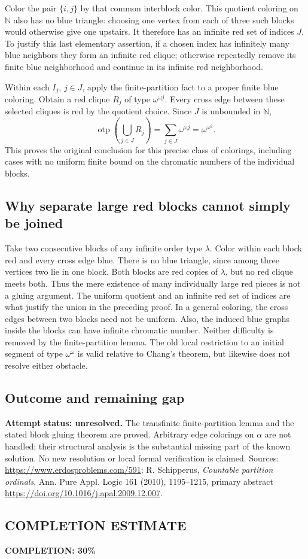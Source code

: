 Color the pair $\{i,j\}$ by that common interblock color. This quotient coloring on $\mathbb N$ also has no blue triangle: choosing one vertex from each of three such blocks would otherwise give one upstairs. It therefore has an infinite red set of indices $J$. To justify this last elementary assertion, if a chosen index has infinitely many blue neighbors they form an infinite red clique; otherwise repeatedly remove its finite blue neighborhood and continue in its infinite red neighborhood.

Within each $I_j$, $j\in J$, apply the finite-partition fact to a proper finite blue coloring. Obtain a red clique $R_j$ of type $\omega^{\omega j}$. Every cross edge between these selected cliques is red by the quotient choice. Since $J$ is unbounded in $\mathbb N$,
\[\operatorname{otp}\left(\bigcup_{j\in J}R_j\right)
=\sum_{j\in J}\omega^{\omega j}=\omega^{\omega^2}.
\]
This proves the original conclusion for this precise class of colorings, including cases with no uniform finite bound on the chromatic numbers of the individual blocks.

\subsection*{Why separate large red blocks cannot simply be joined}
Take two consecutive blocks of any infinite order type $\lambda$. Color within each block red and every cross edge blue. There is no blue triangle, since among three vertices two lie in one block. Both blocks are red copies of $\lambda$, but no red clique meets both. Thus the mere existence of many individually large red pieces is not a gluing argument. The uniform quotient and an infinite red set of indices are what justify the union in the preceding proof.
In a general coloring, the cross edges between two blocks need not be uniform. Also, the induced blue graphs inside the blocks can have infinite chromatic number. Neither difficulty is removed by the finite-partition lemma. The old local restriction to an initial segment of type $\omega^\omega$ is valid relative to Chang's theorem, but likewise does not resolve either obstacle.

\subsection*{Outcome and remaining gap}
\textbf{Attempt status: unresolved.} The transfinite finite-partition lemma and the stated block gluing theorem are proved. Arbitrary edge colorings on $\alpha$ are not handled; their structural analysis is the substantial missing part of the known solution. No new resolution or local formal verification is claimed.
Sources: \url{https://www.erdosproblems.com/591}; R. Schipperus, \emph{Countable partition ordinals}, Ann. Pure Appl. Logic 161 (2010), 1195--1215, primary abstract \url{https://doi.org/10.1016/j.apal.2009.12.007}.

\subsection*{COMPLETION ESTIMATE}
\textbf{COMPLETION: 30\%}
